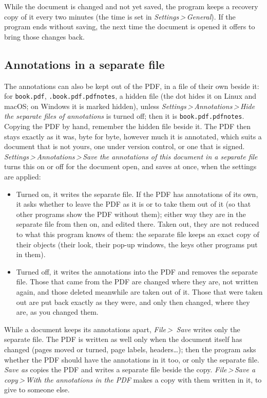\documentclass[12pt,
              article,
              oneside
              ]{memoir}
\newcommand*{\menu}[1]{\textit{#1}}
\newcommand*{\then}{\,>\,}
\begin{document}
%
While the document is changed and not yet saved, the program keeps a
recovery copy of it every two minutes (the time is set in
\menu{Settings\then General}). If the program ends without saving, the next
time the document is opened it offers to bring those changes back.

\subsection{Annotations in a separate file}
\label{sec:apart}

%
The annotations can also be kept out of the PDF, in a file of their own
beside it: for \texttt{book.pdf}, \texttt{.book.pdf.pdfnotes}, a hidden
file (the dot hides it on Linux and macOS; on Windows it is marked hidden),
unless \menu{Settings\then Annotations\then Hide the separate files of
annotations} is turned off; then it is \texttt{book.pdf.pdfnotes}. Copying
the PDF by hand, remember the hidden file beside it. The PDF then stays exactly as it was, byte for byte, however much it is annotated,
which suits a document that is not yours, one under version control, or
one that is signed. \menu{Settings\then Annotations\then Save the
annotations of this document in a separate file} turns this on or off for
the document open, and saves at once, when the settings are applied:

\begin{itemize}
\item Turned on, it writes the separate file. If the PDF has annotations
  of its own, it asks whether to leave the PDF as it is or to take them
  out of it (so that other programs show the PDF without them); either
  way they are in the separate file from then on, and edited there. Taken
  out, they are not reduced to what this program knows of them: the
  separate file keeps an exact copy of their objects (their look, their
  pop-up windows, the keys other programs put in them).
\item Turned off, it writes the annotations into the PDF and removes the
  separate file. Those that came from the PDF are changed where they are,
  not written again, and those deleted meanwhile are taken out of it.
  Those that were taken out are put back exactly as they were, and only
  then changed, where they are, as you changed them.
\end{itemize}

\noindent While a document keeps its annotations apart, \menu{File\then
Save} writes only the separate file. The PDF is written as well only when
the document itself has changed (pages moved or turned, page labels,
headers\ldots); then the program asks whether the PDF should have the
annotations in it too, or only the separate file. \menu{Save as} copies the
PDF and writes a separate file beside the copy. \menu{File\then Save a
copy\then With the annotations in the PDF} makes a copy with them written
in it, to give to someone else.
\end{document}
